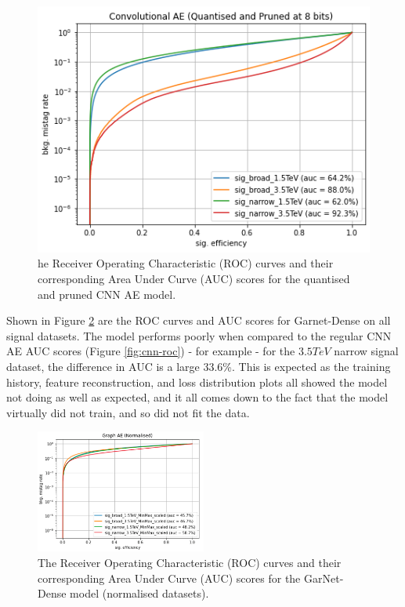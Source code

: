 \documentclass[a4paper]{article}
\theoremstyle{plain}
\theoremstyle{definition}
\begin{document}
\begin{figure}[H]
\begin{minipage}[c]{0.45\linewidth}
                        \includegraphics[width=\textwidth]{cnn-compressed-roc.png}
                        \caption{he Receiver Operating Characteristic (ROC) curves and their corresponding Area Under Curve (AUC) scores for the quantised and pruned CNN AE model.}
                        \label{fig:cnn-compressed-roc}
                    \end{minipage}
            \end{figure}

            Shown in Figure \ref{fig:garnet-roc} are the ROC curves and AUC scores for Garnet-Dense on all signal datasets. The model performs poorly when compared to the regular CNN AE AUC scores (Figure \ref{fig:cnn-roc}) - for example - for the $3.5 TeV$ narrow signal dataset, the difference in AUC is a large 33.6\%. This is expected as the training history, feature reconstruction, and loss distribution plots all showed the model not doing as well as expected, and it all comes down to the fact that the model virtually did not train, and so did not fit the data. 

            \begin{figure}[H]
                \centering
                \begin{minipage}[b]{\linewidth}
                    \centering
                    \includegraphics[width=0.5\textwidth]{garnet-roc.png}
                    \caption{The Receiver Operating Characteristic (ROC) curves and their corresponding Area Under Curve (AUC) scores for the GarNet-Dense model (normalised datasets).}
                    \label{fig:garnet-roc}
                \end{minipage}
            \end{figure}
\end{document}
